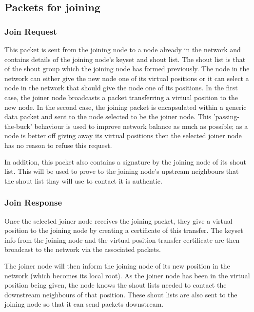 \documentclass[ %
                    author={Luke Murray},
                supervisor={Dr. Simon Hollis},
                     title={Shadow Peer-to-Peer Networks},
                  subtitle={},
                    degree={MEng},
                      year={2013} ]{thesis}
\begin{document}
\subsection{Packets for joining}

\subsubsection{Join Request}

This packet is sent from the joining node to a node already in the network and contains details of the joining node's keyset and shout list. The shout list is that of the shout group which the joining node has formed previously. The node in the network can either give the new node one of its virtual positions or it can select a node in the network that should give the node one of its positions. In the first case, the joiner node broadcasts a packet transferring a virtual position to the new node. In the second case, the joining packet is encapsulated within a generic data packet and sent to the node selected to be the joiner node. This 'passing-the-buck' behaviour is used to improve network balance as much as possible; as a node is better off giving away its virtual positions then the selected joiner node has no reason to refuse this request.

In addition, this packet also contains a signature by the joining node of its shout list. This will be used to prove to the joining node's upstream neighbours that the shout list thay will use to contact it is authentic.

\subsubsection{Join Response}

Once the selected joiner node receives the joining packet, they give a virtual position to the joining node by creating a certificate of this transfer. The keyset info from the joining node and the virtual position transfer certificate are then broadcast to the network via the associated packets.

The joiner node will then inform the joining node of its new position in the network (which becomes its local root). As the joiner node has been in the virtual position being given, the node knows the shout lists needed to contact the downstream neighbours of that position. These shout lists are also sent to the joining node so that it can send packets downstream. %
\end{document}
